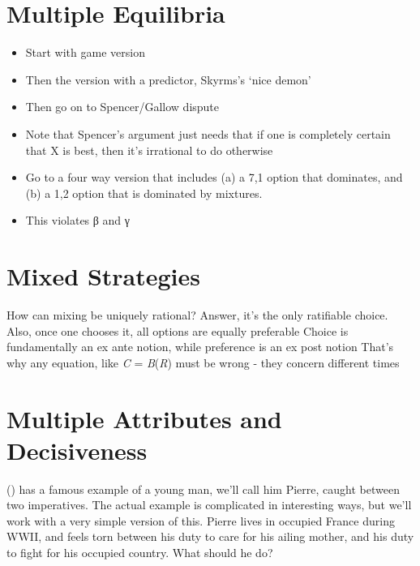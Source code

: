 \documentclass[
  11pt,
  letterpaper,
  DIV=11,
  numbers=noendperiod,
  twoside]{scrartcl}
\providecommand{\tightlist}{%
  \setlength{\itemsep}{0pt}\setlength{\parskip}{0pt}}
\begin{document}
\section{Multiple Equilibria}\label{sec-multieq}

\begin{itemize}
\tightlist
\item
  Start with game version
\item
  Then the version with a predictor, Skyrms's `nice demon'
\item
  Then go on to Spencer/Gallow dispute
\item
  Note that Spencer's argument just needs that if one is completely
  certain that X is best, then it's irrational to do otherwise
\item
  Go to a four way version that includes (a) a 7,1 option that
  dominates, and (b) a 1,2 option that is dominated by mixtures.
\item
  This violates β and γ
\end{itemize}

\section{Mixed Strategies}\label{sec-mixed}

How can mixing be uniquely rational? Answer, it's the only ratifiable
choice. Also, once one chooses it, all options are equally preferable
Choice is fundamentally an ex ante notion, while preference is an ex
post notion That's why any equation, like \emph{C} = \emph{B}(\emph{R})
must be wrong - they concern different times

\section{Multiple Attributes and Decisiveness}\label{sec-sartre}

() has a famous example
of a young man, we'll call him Pierre, caught between two imperatives.
The actual example is complicated in interesting ways, but we'll work
with a very simple version of this. Pierre lives in occupied France
during WWII, and feels torn between his duty to care for his ailing
mother, and his duty to fight for his occupied country. What should he
do?
\end{document}
